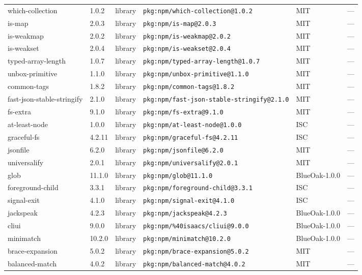 \documentclass[11pt]{article}
\begin{document}
\begin{longtable}{|l|l|l|p{2.2cm}|l|p{4cm}|}
which-collection & 1.0.2 & library & \texttt{pkg:npm/which-collection@1.0.2} & MIT & — \\
is-map & 2.0.3 & library & \texttt{pkg:npm/is-map@2.0.3} & MIT & — \\
is-weakmap & 2.0.2 & library & \texttt{pkg:npm/is-weakmap@2.0.2} & MIT & — \\
is-weakset & 2.0.4 & library & \texttt{pkg:npm/is-weakset@2.0.4} & MIT & — \\
typed-array-length & 1.0.7 & library & \texttt{pkg:npm/typed-array-length@1.0.7} & MIT & — \\
unbox-primitive & 1.1.0 & library & \texttt{pkg:npm/unbox-primitive@1.1.0} & MIT & — \\
common-tags & 1.8.2 & library & \texttt{pkg:npm/common-tags@1.8.2} & MIT & — \\
fast-json-stable-stringify & 2.1.0 & library & \texttt{pkg:npm/fast-json-stable-stringify@2.1.0} & MIT & — \\
fs-extra & 9.1.0 & library & \texttt{pkg:npm/fs-extra@9.1.0} & MIT & — \\
at-least-node & 1.0.0 & library & \texttt{pkg:npm/at-least-node@1.0.0} & ISC & — \\
graceful-fs & 4.2.11 & library & \texttt{pkg:npm/graceful-fs@4.2.11} & ISC & — \\
jsonfile & 6.2.0 & library & \texttt{pkg:npm/jsonfile@6.2.0} & MIT & — \\
universalify & 2.0.1 & library & \texttt{pkg:npm/universalify@2.0.1} & MIT & — \\
glob & 11.1.0 & library & \texttt{pkg:npm/glob@11.1.0} & BlueOak-1.0.0 & — \\
foreground-child & 3.3.1 & library & \texttt{pkg:npm/foreground-child@3.3.1} & ISC & — \\
signal-exit & 4.1.0 & library & \texttt{pkg:npm/signal-exit@4.1.0} & ISC & — \\
jackspeak & 4.2.3 & library & \texttt{pkg:npm/jackspeak@4.2.3} & BlueOak-1.0.0 & — \\
cliui & 9.0.0 & library & \texttt{pkg:npm/\%40isaacs/cliui@9.0.0} & BlueOak-1.0.0 & — \\
minimatch & 10.2.0 & library & \texttt{pkg:npm/minimatch@10.2.0} & BlueOak-1.0.0 & — \\
brace-expansion & 5.0.2 & library & \texttt{pkg:npm/brace-expansion@5.0.2} & MIT & — \\
balanced-match & 4.0.2 & library & \texttt{pkg:npm/balanced-match@4.0.2} & MIT & — \\

\end{longtable}
\end{document}
